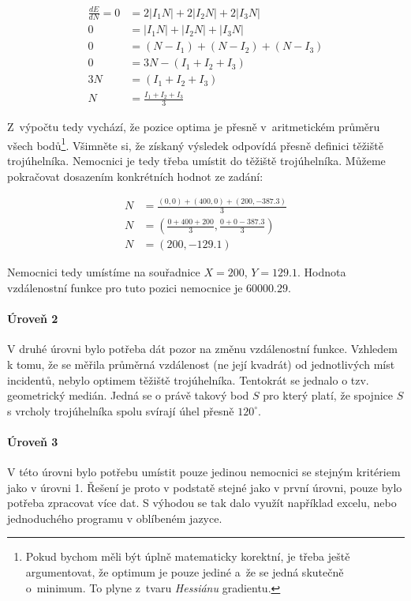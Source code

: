 \documentclass[12pt,a4paper]{article}
\begin{document}
\begin{align}
\frac{dE}{dN} = 0 &= 2|I_1 N| + 2|I_2N| + 2|I_3N| \nonumber \\
0 &= |I_1 N| + |I_2N| + |I_3N| \nonumber \\
0 &= (N-I_1) + (N-I_2) + (N-I_3) \nonumber \\
0 &= 3N - (I_1 + I_2 + I_3) \nonumber \\
3N &= (I_1 + I_2 + I_3) \nonumber \\
N &= \frac{I_1 + I_2 + I_3}{3} \nonumber
\end{align}

Z~výpočtu tedy vychází, že pozice optima je přesně v~aritmetickém průměru
všech bodů\footnote{Pokud bychom měli být úplně matematicky korektní, je třeba
ještě argumentovat, že optimum je pouze jediné a~že se jedná skutečně o~minimum.
To plyne z~tvaru \textit{Hessiánu} gradientu.}. Všimněte si, že získaný výsledek
odpovídá přesně definici těžiště trojúhelníka. Nemocnici je tedy třeba umístit
do těžiště trojúhelníka. Můžeme pokračovat dosazením konkrétních hodnot ze zadání:

\begin{align}
N &= \frac{(0, 0) + (400, 0) + (200, -387.3)}{3} \nonumber \\
N &= \left( \frac{0 + 400 + 200}{3}, \frac{0 + 0 - 387.3}{3} \right) \nonumber \\
N &= (200, -129.1)  \nonumber
\end{align}

Nemocnici tedy umístíme na souřadnice $X=200$, $Y=129.1$. Hodnota vzdálenostní
funkce pro tuto pozici nemocnice je $60000.29$.

\paragraph*{Úroveň 2}
V druhé úrovni bylo potřeba dát pozor na změnu vzdálenostní funkce. Vzhledem k tomu, že se měřila průměrná vzdálenost (ne její kvadrát) od jednotlivých míst incidentů,
nebylo optimem těžiště trojúhelníka. Tentokrát se jednalo o tzv. geometrický medián. Jedná se o právě takový bod $S$ pro který platí, že spojnice $S$ s vrcholy trojúhelníka spolu svírají úhel přesně $120^\circ$.
\paragraph*{Úroveň 3}
V této úrovni bylo potřebu umístit pouze jedinou nemocnici se stejným kritériem jako v úrovni 1. Řešení je proto v podstatě stejné jako v první úrovni, pouze bylo potřeba zpracovat více dat. S výhodou se tak dalo využít například excelu, nebo jednoduchého programu v oblíbeném jazyce.
\end{document}
